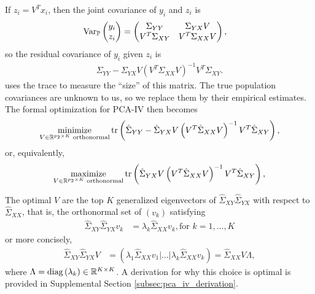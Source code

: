 \documentclass[14pt]{extarticle}
\begin{document}
If $z_{i} = V^{T}x_{i}$, then the joint covariance of $y_{i}$ and $z_{i}$ is
\begin{align*}
  \mathrm{Var}_{\mathbb{P}}\begin{pmatrix} y_{i} \\ z_{i} \end{pmatrix} &=
  \begin{pmatrix}
    \Sigma_{YY} & \Sigma_{YX}V \\
    V^{T}\Sigma_{XY} & V^{T}\Sigma_{XX}V
  \end{pmatrix},
\end{align*}
so the residual covariance of $y_i$ given $z_{i}$ is
\begin{align}
  \Sigma_{YY} -
  \Sigma_{YX}V\left(V^{T}\Sigma_{XX}V\right)^{-1}V^{T}\Sigma_{XY}. \label{eq:pca_iv_resid_cov}
\end{align}
\citep{rao1964use} uses the trace to measure the ``size'' of this matrix. The
true population covariances are unknown to us, so we replace them by their
empirical estimates. The formal optimization for PCA-IV then becomes
\begin{align}
  \mathop\mathrm{minimize}_{V\in \mathbb{R}^{p_{2} \times K} \text{ orthonormal}}
  \mathop\mathrm{tr}\left(\hat{\Sigma}_{YY} -
  \hat{\Sigma}_{YX}V\left(V^{T}\hat{\Sigma}_{XX}V\right)^{-1}V^{T}\hat{\Sigma}_{XY}\right) \label{eq:pca_iv_obj},
\end{align}
or, equivalently,
\begin{align}
  \mathop\mathrm{maximize}_{V\in \mathbb{R}^{p_{2} \times K} \text{ orthonormal}}
  \mathop\mathrm{tr}\left(\hat{\Sigma}_{YX}V\left(V^{T}\hat{\Sigma}_{XX}V\right)^{-1}V^{T}\hat{\Sigma}_{XY}\right) \label{eq:pca_iv_obj_2},
\end{align}

The optimal $V$ are the top $K$ generalized eigenvectors of
$\hat{\Sigma}_{XY}\hat{\Sigma}_{YX}$ with respect to $\hat{\Sigma}_{XX}$, that
is, the orthonormal set of $\left(v_{k}\right)$ satisfying
\begin{align*}
  \hat{\Sigma}_{XY}\hat{\Sigma}_{YX}v_{k} &= \lambda_{k}
  \hat{\Sigma}_{XX}v_{k}, \text{for } k = 1, \dots, K
\end{align*}
or more concisely,
\begin{align*}
\hat{\Sigma}_{XY}\hat{\Sigma}_{YX}V &= \left( \lambda_{1}
  \hat{\Sigma}_{XX}v_{1} \vert \dots \vert
  \lambda_{k}\hat{\Sigma}_{XX}v_{k}\right) =
\hat{\Sigma}_{XX}V\Lambda,
\end{align*}
where $\Lambda = \mathop\mathrm{diag}\left(\lambda_{k}\right) \in \mathbb{R}^{K \times K}$. A
derivation for why this choice is optimal is provided in Supplemental Section
\ref{subsec:pca_iv_derivation}.
\end{document}
